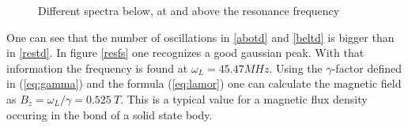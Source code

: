 \begin{figure}[H]
            \caption{Different spectra below, at and above the resonance frequency}
         \end{figure}
     One can see that the number of oscillations in \ref{abotd} and \ref{beltd} is bigger than in \ref{restd}. In figure \ref{resfs} one recognizes a good gaussian peak.
     With that information the frequency is found at $\omega_L = 45.47\unit{MHz}$. Using the $\gamma$-factor defined in (\ref{eq:gamma}) and the formula (\ref{eq:lamor}) one can calculate the magnetic field as $B_z = \omega_L/\gamma = 0.525\ \unit{T}$. This is a typical value for a magnetic flux density occuring in the bond of a solid state body.
         
